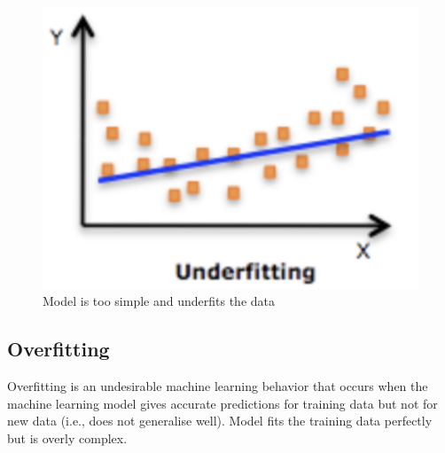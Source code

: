 \documentclass{report}
\begin{document}
\begin{figure}[H]
  \centering
  \includegraphics[scale=0.35]{images/04.png}
  \caption{Model is too simple and underfits the data}
\end{figure}

\subsection{Overfitting}
Overfitting is an undesirable machine learning behavior that occurs when the machine learning model gives accurate predictions for training data but not for new data (i.e., does not generalise well). Model fits the training data perfectly but is overly complex.
\end{document}
